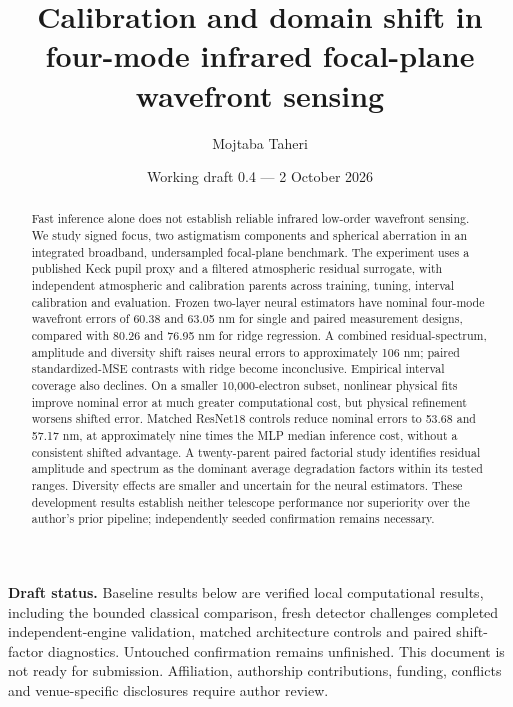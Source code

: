 \documentclass[11pt,a4paper]{article}
\title{Calibration and domain shift in four-mode infrared focal-plane wavefront sensing}
\author{Mojtaba Taheri}
\date{Working draft 0.4 --- 2 October 2026}
\begin{document}
\maketitle
\noindent\textbf{Draft status.} Baseline results below are verified local computational
results, including the bounded classical comparison, fresh detector challenges
completed independent-engine validation, matched architecture controls and
paired shift-factor diagnostics. Untouched confirmation remains unfinished.
This document is not ready for submission. Affiliation, authorship contributions,
funding, conflicts and venue-specific disclosures require author review.

\begin{abstract}
Fast inference alone does not establish reliable infrared low-order wavefront
sensing. We study signed focus, two astigmatism components and spherical
aberration in an integrated broadband, undersampled focal-plane benchmark.
The experiment uses a published Keck pupil proxy and a filtered atmospheric
residual surrogate, with independent atmospheric and calibration parents across
training, tuning, interval calibration and evaluation. Frozen two-layer neural
estimators have nominal four-mode wavefront errors of 60.38 and 63.05 nm for
single and paired measurement designs, compared with 80.26 and 76.95 nm for
ridge regression. A combined residual-spectrum, amplitude and diversity shift
raises neural errors to approximately 106 nm; paired standardized-MSE contrasts
with ridge become inconclusive. Empirical interval coverage also declines.
On a smaller 10,000-electron subset, nonlinear physical fits improve nominal
error at much greater computational cost, but physical refinement worsens
shifted error. Matched ResNet18 controls reduce nominal errors to 53.68 and
57.17 nm, at approximately nine times the MLP median inference cost, without
a consistent shifted advantage. A twenty-parent paired factorial study
identifies residual amplitude and spectrum as the dominant average degradation
factors within its tested ranges. Diversity effects are smaller and uncertain
for the neural estimators. These development results establish neither
telescope performance nor superiority over the author's prior pipeline;
independently seeded confirmation remains necessary.
\end{abstract}
\end{document}
